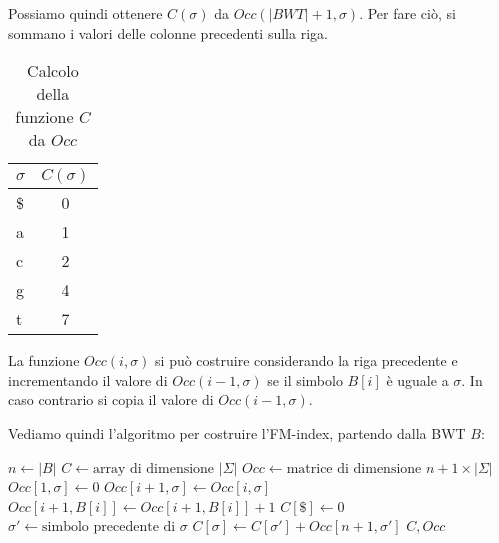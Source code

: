 \begin{esempio}
    Possiamo quindi ottenere $C(\sigma)$ da $Occ(|BWT| + 1,\sigma)$. Per fare ciò,
    si sommano i valori delle colonne precedenti sulla riga.
    \begin{table}[!ht]
        \centering
        \begin{tabular}{|l|c|}
            \hline
            \rowcolor[HTML]{EFEFEF}
            \textbf{$\sigma$} & \textbf{$C(\sigma)$} \\ \hline
            \$                & 0                    \\ \hline
            a                 & 1                    \\ \hline
            c                 & 2                    \\ \hline
            g                 & 4                    \\ \hline
            t                 & 7                    \\ \hline
        \end{tabular}
        \caption{Calcolo della funzione $C$ da $Occ$}
    \end{table}
\end{esempio}
\newpage
La funzione $Occ(i, \sigma)$ si può costruire considerando la riga precedente e
incrementando il valore di $Occ(i - 1, \sigma)$ se il simbolo $B[i]$ è uguale a
$\sigma$. In caso contrario si copia il valore di $Occ(i - 1, \sigma)$.

Vediamo quindi l'algoritmo per costruire l'FM-index, partendo dalla BWT $B$:

\begin{algorithm}
    \begin{algorithmic}
        \State $n \gets |B|$
        \State $C \gets \text{array di dimensione } |\Sigma|$
        \State $Occ \gets \text{matrice di dimensione } n + 1 \times |\Sigma|$
        \For{$\sigma \in \Sigma$}
        \State $Occ[1, \sigma] \gets 0$
        \EndFor
        \State $Occ[i + 1, \sigma] \gets Occ[i, \sigma]$
        \EndFor
        \State $Occ[i + 1, B[i]] \gets Occ[i + 1, B[i]] + 1$
        \EndFor
        \State $C[\$] \gets 0$
        \State $\sigma' \gets \text{simbolo precedente di } \sigma$
        \State $C[\sigma] \gets C[\sigma'] + Occ[n + 1, \sigma']$
        \EndFor
        \State \Return $C, Occ$
        \EndFunction
    \end{algorithmic}
\end{algorithm}

